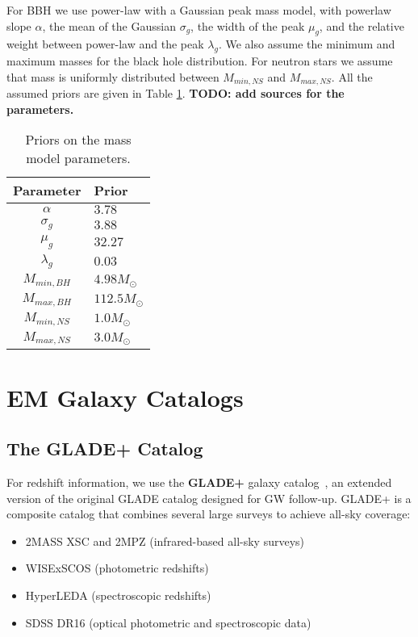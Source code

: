 For \ac{BBH} we use power-law with a Gaussian peak mass model, with powerlaw slope $\alpha$, the mean of the Gaussian $\sigma_g$, the width 
of the peak $\mu_g$, and the relative weight between power-law and
the peak $\lambda_g$. We also assume the minimum and maximum masses for the black hole distribution. For neutron stars we assume that
mass is uniformly distributed between $M_{min,NS}$ and
$M_{max,NS}$. All the assumed priors are given in Table \ref{tab:mass_dist}. \textbf{TODO: add sources for the parameters.}

\begin{table}[h!]
    \centering
    \caption{Priors on the mass model parameters.}
    \label{tab:mass_dist}
    \begin{tabular}{c l}
        \hline
        \textbf{Parameter} & \textbf{Prior} \\
        \hline
         $\alpha$ & $3.78$ \\
         $\sigma_g$ & $3.88$ \\
         $\mu_g$ & $32.27$ \\
         $\lambda_g$ & $0.03$ \\
         $M_{min,BH}$ & $4.98M_{\odot}$ \\
         $M_{max,BH}$ & $112.5M_{\odot}$ \\
         $M_{min, NS}$ & $1.0M_{\odot}$ \\
         $M_{max, NS}$ & $3.0M_{\odot}$ \\
         \hline
    \end{tabular}
\end{table}


\section{\ac{EM} Galaxy Catalogs}

\subsection{The GLADE+ Catalog}

For redshift information, we use the \textbf{GLADE+} galaxy catalog~\citep{dalya2022glade+}, an extended version of the original GLADE catalog designed for \ac{GW} follow-up. GLADE+ is a composite catalog that combines several large surveys to achieve all-sky coverage:
\vspace{-2em}
\begin{itemize}
  \item 2MASS XSC and 2MPZ (infrared-based all-sky surveys)
  \vspace{-1em}
  \item WISExSCOS (photometric redshifts)
  \vspace{-1em}
  \item HyperLEDA (spectroscopic redshifts)
  \vspace{-1em}
  \item SDSS DR16 (optical photometric and spectroscopic data)
\end{itemize}

